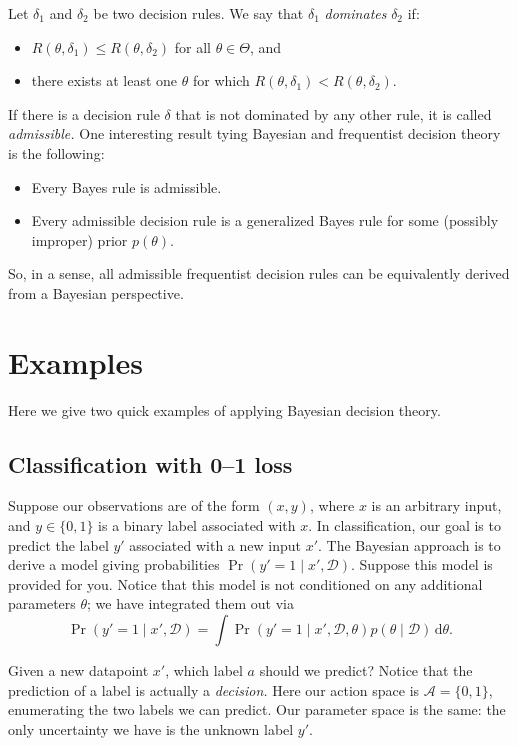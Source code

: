 \documentclass{article}
\newcommand{\given}{\mid}
\newcommand{\mc}[1]{\mathcal{#1}}
\newcommand{\data}{\mc{D}}
\newcommand{\intd}[1]{\,\mathrm{d}{#1}}
\begin{document}
Let $\delta_1$ and $\delta_2$ be two decision rules.  We say that
$\delta_1$ \emph{dominates} $\delta_2$ if:
\begin{itemize}
\item
  $R(\theta, \delta_1) \leq R(\theta, \delta_2)$ for all $\theta \in
  \Theta$, and
\item
  there exists at least one $\theta$ for which $R(\theta, \delta_1) <
  R(\theta, \delta_2)$.
\end{itemize}
If there is a decision rule $\delta$ that is not dominated by any
other rule, it is called \emph{admissible.} One interesting result
tying Bayesian and frequentist decision theory is the following:
\begin{itemize}
\item
  Every Bayes rule is admissible.
\item
  Every admissible decision rule is a generalized Bayes rule for some
  (possibly improper) prior $p(\theta)$.
\end{itemize}
So, in a sense, all admissible frequentist decision rules can be
equivalently derived from a Bayesian perspective.

\section*{Examples}

Here we give two quick examples of applying Bayesian decision theory.

\subsection*{Classification with 0--1 loss}

Suppose our observations are of the form $(x, y)$, where $x$ is an
arbitrary input, and $y \in \{0, 1\}$ is a binary label associated
with $x$.  In classification, our goal is to predict the label $y'$
associated with a new input $x'$. The Bayesian approach is to derive a
model giving probabilities $\Pr(y' = 1 \given x', \data)$.  Suppose
this model is provided for you.  Notice that this model is not
conditioned on any additional parameters $\theta$; we have
integrated them out via
\begin{equation*}
  \Pr(y' = 1 \given x', \data)
  =
  \int
  \Pr(y' = 1 \given x', \data, \theta)
  p(\theta \given \data)
  \intd{\theta}.
\end{equation*}

Given a new datapoint $x'$, which label $a$ should we predict?  Notice
that the prediction of a label is actually a \emph{decision.}  Here
our action space is $\mc{A} = \{0, 1\}$, enumerating the two labels we
can predict.  Our parameter space is the same: the only uncertainty we
have is the unknown label $y'$.
\end{document}
